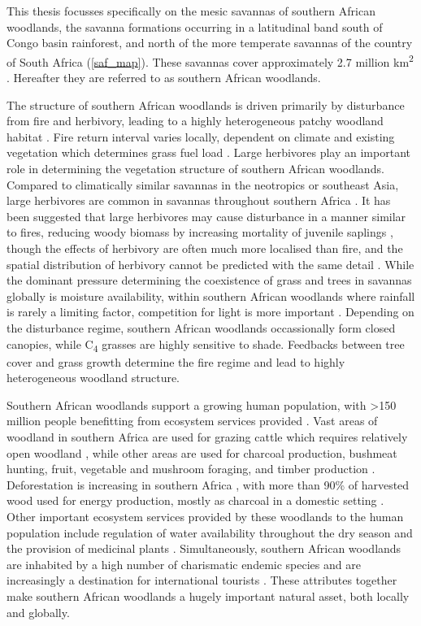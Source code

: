 \begin{refsection}
This thesis focusses specifically on the mesic savannas of southern African woodlands, the savanna formations occurring in a latitudinal band south of Congo basin rainforest, and north of the more temperate savannas of the country of South Africa (\autoref{saf_map}). These savannas cover approximately 2.7 million km\textsuperscript{2} \citep{Arino2010}. Hereafter they are referred to as southern African woodlands.

The structure of southern African woodlands is driven primarily by disturbance from fire and herbivory, leading to a highly heterogeneous patchy woodland habitat \citep{Archibald2019}. Fire return interval varies locally, dependent on climate and existing vegetation which determines grass fuel load \citep{Archibald2010}. Large herbivores play an important role in determining the vegetation structure of southern African woodlands. Compared to climatically similar savannas in the neotropics or southeast Asia, large herbivores are common in savannas throughout southern Africa \citep{Asner2009}. It has been suggested that large herbivores may cause disturbance in a manner similar to fires, reducing woody biomass by increasing mortality of juvenile saplings \citep{Bond2005}, though the effects of herbivory are often much more localised than fire, and the spatial distribution of herbivory cannot be predicted with the same detail \citep{Hempson2015}. While the dominant pressure determining the coexistence of grass and trees in savannas globally is moisture availability, within southern African woodlands where rainfall is rarely a limiting factor, competition for light is more important \citep{Vadigi2013}. Depending on the disturbance regime, southern African woodlands occassionally form closed canopies, while C\textsubscript{4} grasses are highly sensitive to shade. Feedbacks between tree cover and grass growth determine the fire regime and lead to highly heterogeneous woodland structure.

Southern African woodlands support a growing human population, with >150 million people benefitting from ecosystem services provided \citep{Ryan2016, Wunder2014}. Vast areas of woodland in southern Africa are used for grazing cattle which requires relatively open woodland \citep{Njana2013}, while other areas are used for charcoal production, bushmeat hunting, fruit, vegetable and mushroom foraging, and timber production \citep{Ryan2016}. Deforestation is increasing in southern Africa \citep{Hansen2013}, with more than 90\% of harvested wood used for energy production, mostly as charcoal in a domestic setting \citep{May-Tobin2011}. Other important ecosystem services provided by these woodlands to the human population include regulation of water availability throughout the dry season \citep{Wilk2010, Hecky2003} and the provision of medicinal plants \citep{Ryan2016, Augustino2011}. Simultaneously, southern African woodlands are inhabited by a high number of charismatic endemic species \citep{Burgess2004} and are increasingly a destination for international tourists \citep{Vergles2015, Shackleton2007}. These attributes together make southern African woodlands a hugely important natural asset, both locally and globally.


\end{refsection}
